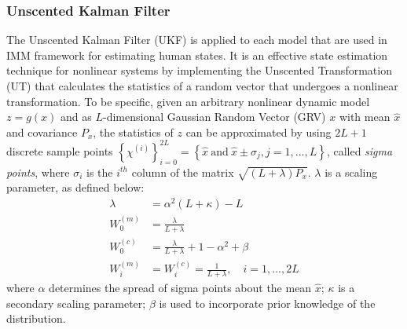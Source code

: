 \documentclass[letterpaper, 10 pt, conference]{ieeeconf}
\begin{document}
	\subsubsection{Unscented Kalman Filter}\label{subsec:UKF}
	The Unscented Kalman Filter (UKF) is applied to each model that are used in IMM framework for estimating human states. 
	It is an effective state estimation technique for nonlinear systems by implementing the Unscented Transformation (UT) that calculates the statistics of a random vector that undergoes a nonlinear transformation\cite {haykin2004kalman}.
	To be specific, given an arbitrary nonlinear dynamic model $z=g(x)$ and as $L$-dimensional Gaussian Random Vector (GRV) $x$ with mean $\hat{x}$ and covariance $P_x$, the statistics of $z$ can be approximated by using $2L+1$ discrete sample points $\left\{\chi^{(i)} \right\}_{i=0}^{2L}=\left\{ \hat{x}\ \text{and}\  \hat{x} \pm \sigma_j, j=1,...,L\right \}$, called \textit{sigma points}, where $\sigma_i$ is the $i^{th}$ column of the matrix $\sqrt{(L+\lambda)P_x}$. $\lambda$ is a scaling parameter, as defined below:
	\begin{subequations}
		\begin{align}
			\lambda&=\alpha^2(L+\kappa)-L\\
			W_0^{(m)}&=\frac{\lambda}{L+\lambda}\\
			W_0^{(c)}&=\frac{\lambda}{L+\lambda}+1-\alpha^2+\beta\\
			W_i^{(m)}&=W_i^{(c)}=\frac{1}{L+\lambda},\quad i=1,...,2L 
		\end{align}
	\end{subequations}
	where $\alpha$ determines the spread of sigma points about the mean $\hat{x}$; $\kappa$ is a secondary scaling parameter; $\beta$ is used to incorporate prior knowledge of the distribution.	
	
\end{document}
